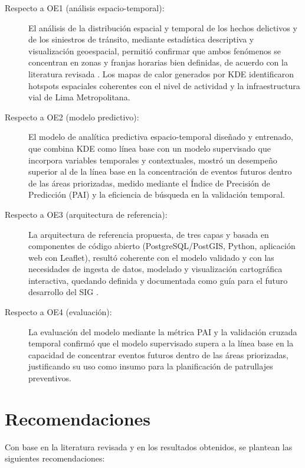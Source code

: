 \begin{description}
    \item[Respecto a OE1 (an\'alisis espacio-temporal):] El an\'alisis de la distribuci\'on espacial y temporal de los hechos delictivos y de los siniestros de tr\'ansito, mediante estad\'istica descriptiva y visualizaci\'on geoespacial, permiti\'o confirmar que ambos fen\'omenos se concentran en zonas y franjas horarias bien definidas, de acuerdo con la literatura revisada \citep{eck2005mapping,chainey2008kde}. Los mapas de calor generados por KDE identificaron hotspots espaciales coherentes con el nivel de actividad y la infraestructura vial de Lima Metropolitana.
    \item[Respecto a OE2 (modelo predictivo):] El modelo de anal\'itica predictiva espacio-temporal dise\~nado y entrenado, que combina KDE como l\'inea base con un modelo supervisado que incorpora variables temporales y contextuales, mostr\'o un desempe\~no superior al de la l\'inea base en la concentraci\'on de eventos futuros dentro de las \'areas priorizadas, medido mediante el \'Indice de Precisi\'on de Predicci\'on (PAI) y la eficiencia de b\'usqueda en la validaci\'on temporal.
    \item[Respecto a OE3 (arquitectura de referencia):] La arquitectura de referencia propuesta, de tres capas y basada en componentes de c\'odigo abierto (PostgreSQL/PostGIS, Python, aplicaci\'on web con Leaflet), result\'o coherente con el modelo validado y con las necesidades de ingesta de datos, modelado y visualizaci\'on cartogr\'afica interactiva, quedando definida y documentada como gu\'ia para el futuro desarrollo del SIG \citep{postgis2024}.
    \item[Respecto a OE4 (evaluaci\'on):] La evaluaci\'on del modelo mediante la m\'etrica PAI y la validaci\'on cruzada temporal confirm\'o que el modelo supervisado supera a la l\'inea base en la capacidad de concentrar eventos futuros dentro de las \'areas priorizadas, justificando su uso como insumo para la planificaci\'on de patrullajes preventivos.
\end{description}

\section{Recomendaciones}

Con base en la literatura revisada y en los resultados obtenidos, se plantean las siguientes recomendaciones:

